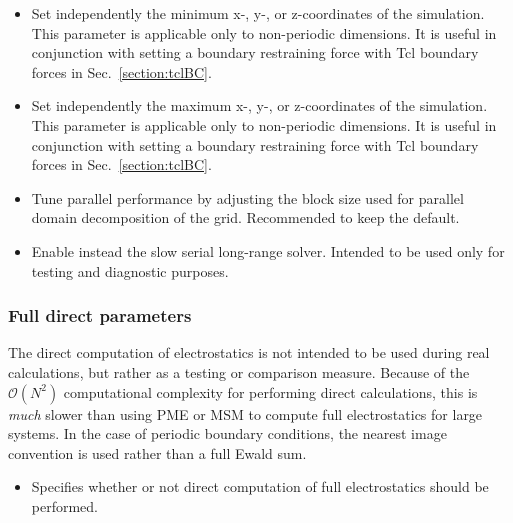 \begin{itemize}
\item
{}
{Set independently the minimum x-, y-, or z-coordinates of 
the simulation.  This parameter is applicable only to non-periodic dimensions. 
It is useful in conjunction with setting a boundary restraining force 
with Tcl boundary forces in Sec.~\ref{section:tclBC}.}

\item
{}
{Set independently the maximum x-, y-, or z-coordinates of 
the simulation.  This parameter is applicable only to non-periodic dimensions. 
It is useful in conjunction with setting a boundary restraining force 
with Tcl boundary forces in Sec.~\ref{section:tclBC}.}

\item
{}
{Tune parallel performance by adjusting the block size used for parallel 
domain decomposition of the grid.  Recommended to keep the default.}

\item
{}
{Enable instead the slow serial long-range solver. 
Intended to be used only for testing and diagnostic purposes.}

\end{itemize}


\subsubsection{Full direct parameters}

The direct computation of electrostatics 
is not intended to be used during 
real calculations, but rather as a testing or 
comparison measure.  Because of the ${\mathcal O}(N^2)$ 
computational complexity for performing 
direct calculations, this is {\it much} 
slower than using PME or MSM to compute full 
electrostatics for large systems.
In the case of periodic boundary conditions,
the nearest image convention is used rather than a
full Ewald sum.

\begin{itemize}

\item
{}
{Specifies whether or not direct computation of 
full electrostatics should be performed.}

\end{itemize}



